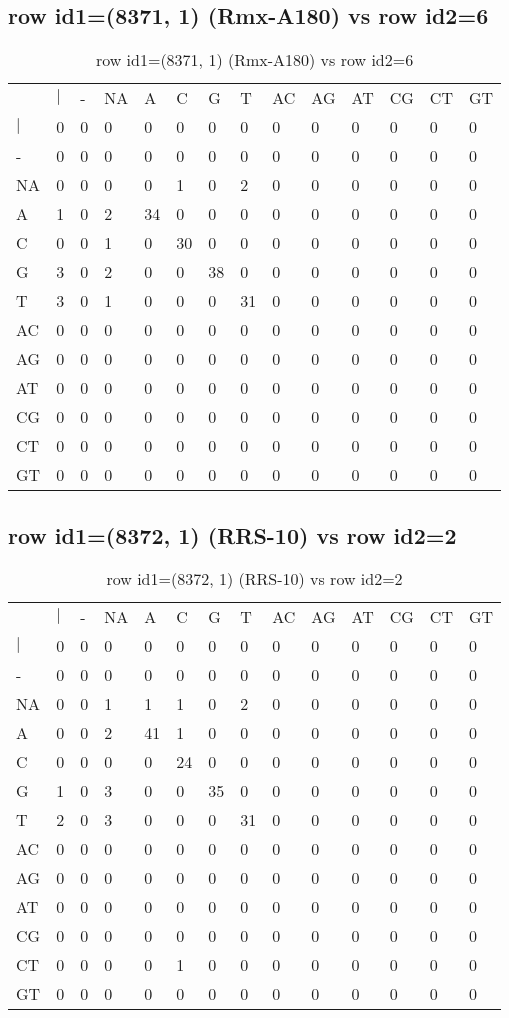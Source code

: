 \subsection{row id1=(8371, 1) (Rmx-A180) vs row id2=6}
\begin{center}
\begin{longtable}{|l|l|l|l|l|l|l|l|l|l|l|l|l|l|}
\caption{row id1=(8371, 1) (Rmx-A180) vs row id2=6} \label{table_dm404}\\
\hline
\\
\hline
&$|$&-&NA&A&C&G&T&AC&AG&AT&CG&CT&GT\\
$|$&0&0&0&0&0&0&0&0&0&0&0&0&0\\
-&0&0&0&0&0&0&0&0&0&0&0&0&0\\
NA&0&0&0&0&1&0&2&0&0&0&0&0&0\\
A&1&0&2&34&0&0&0&0&0&0&0&0&0\\
C&0&0&1&0&30&0&0&0&0&0&0&0&0\\
G&3&0&2&0&0&38&0&0&0&0&0&0&0\\
T&3&0&1&0&0&0&31&0&0&0&0&0&0\\
AC&0&0&0&0&0&0&0&0&0&0&0&0&0\\
AG&0&0&0&0&0&0&0&0&0&0&0&0&0\\
AT&0&0&0&0&0&0&0&0&0&0&0&0&0\\
CG&0&0&0&0&0&0&0&0&0&0&0&0&0\\
CT&0&0&0&0&0&0&0&0&0&0&0&0&0\\
GT&0&0&0&0&0&0&0&0&0&0&0&0&0\\
\hline
\end{longtable}
\end{center}

\subsection{row id1=(8372, 1) (RRS-10) vs row id2=2}
\begin{center}
\begin{longtable}{|l|l|l|l|l|l|l|l|l|l|l|l|l|l|}
\caption{row id1=(8372, 1) (RRS-10) vs row id2=2} \label{table_dm406}\\
\hline
\\
\hline
&$|$&-&NA&A&C&G&T&AC&AG&AT&CG&CT&GT\\
$|$&0&0&0&0&0&0&0&0&0&0&0&0&0\\
-&0&0&0&0&0&0&0&0&0&0&0&0&0\\
NA&0&0&1&1&1&0&2&0&0&0&0&0&0\\
A&0&0&2&41&1&0&0&0&0&0&0&0&0\\
C&0&0&0&0&24&0&0&0&0&0&0&0&0\\
G&1&0&3&0&0&35&0&0&0&0&0&0&0\\
T&2&0&3&0&0&0&31&0&0&0&0&0&0\\
AC&0&0&0&0&0&0&0&0&0&0&0&0&0\\
AG&0&0&0&0&0&0&0&0&0&0&0&0&0\\
AT&0&0&0&0&0&0&0&0&0&0&0&0&0\\
CG&0&0&0&0&0&0&0&0&0&0&0&0&0\\
CT&0&0&0&0&1&0&0&0&0&0&0&0&0\\
GT&0&0&0&0&0&0&0&0&0&0&0&0&0\\
\hline
\end{longtable}
\end{center}


